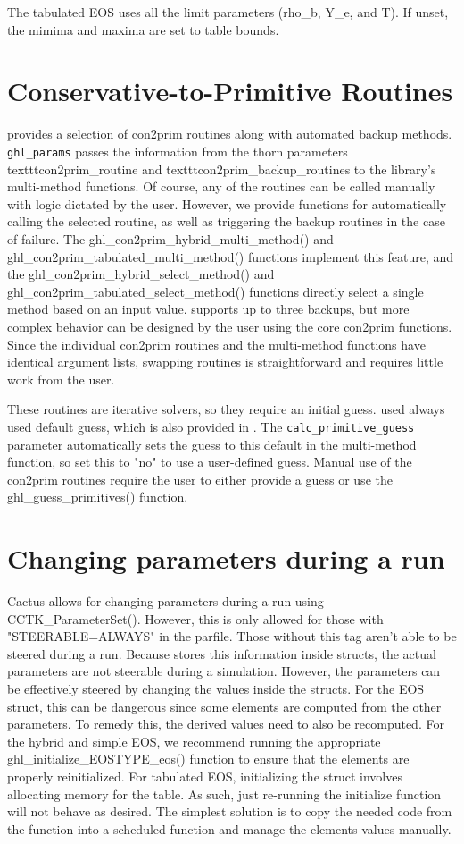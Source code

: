 \documentclass{article}
\begin{document}
The tabulated EOS uses all the limit parameters (rho\_b, Y\_e, and T).
If unset, the mimima and maxima are set to table bounds.

\section{Conservative-to-Primitive Routines}

\grhayl{} provides a selection of con2prim routines along with automated
backup methods. \texttt{ghl\_params} passes the information from the
thorn parameters texttt{con2prim\_routine} and texttt{con2prim\_backup\_routines}
to the library's multi-method functions. Of course, any of the routines
can be called manually with logic dictated by the user. However, we
provide functions for automatically calling the selected routine,
as well as triggering the backup routines in the case of failure.
The ghl\_con2prim\_hybrid\_multi\_method() and
ghl\_con2prim\_tabulated\_multi\_method() functions implement this
feature, and the ghl\_con2prim\_hybrid\_select\_method() and
ghl\_con2prim\_tabulated\_select\_method() functions directly select
a single method based on an input value. \grhayl{} supports up to three
backups, but more complex behavior can be designed by the user using
the core con2prim functions. Since the individual con2prim routines
and the multi-method functions have identical argument lists, swapping
routines is straightforward and requires little work from the user.

These routines are iterative solvers, so they require an initial guess.
\igm{} used always used default guess, which is also provided in \grhayl.
The \texttt{calc\_primitive\_guess} parameter automatically sets the
guess to this default in the multi-method function, so set this to
"no" to use a user-defined guess. Manual use of the con2prim
routines require the user to either provide a guess or use the
ghl\_guess\_primitives() function.

\section{Changing parameters during a run}

Cactus allows for changing parameters during a run using CCTK\_ParameterSet().
However, this is only allowed for those with "STEERABLE=ALWAYS" in the parfile.
Those without this tag aren't able to be steered during a run. Because \glib{}
stores this information inside \grhayl{} structs, the actual parameters are not
steerable during a simulation. However, the parameters can be effectively steered
by changing the values inside the structs. For the EOS struct, this can be
dangerous since some elements are computed from the other parameters. To remedy
this, the derived values need to also be recomputed. For the hybrid and simple EOS,
we recommend running the appropriate ghl\_initialize\_EOSTYPE\_eos() function
to ensure that the elements are properly reinitialized. For tabulated EOS,
initializing the struct involves allocating memory for the table. As such,
just re-running the initialize function will not behave as desired. The simplest
solution is to copy the needed code from the \grhayl{} function into a scheduled
function and manage the elements values manually.
\end{document}
